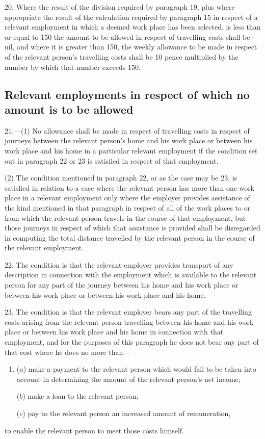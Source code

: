 \documentclass[a4paper]{article}
\begin{document}
\medskip

20.  Where the result of the division required by paragraph 19, plus where appropriate the result of the calculation required by paragraph 15 in respect of a relevant employment in which a deemed work place has been selected, is less than or equal to 150 the amount to be allowed in respect of travelling costs shall be nil, and where it is greater than 150, the weekly allowance to be made in respect of the relevant person’s travelling costs shall be 10 pence multiplied by the number by which that number exceeds 150.

\subsection*{Relevant employments in respect of which no amount is to be allowed}

21.—(1) No allowance shall be made in respect of travelling costs in respect of journeys between the relevant person’s home and his work place or between his work place and his home in a particular relevant employment if the condition set out in paragraph 22 or 23 is satisfied in respect of that employment.

(2) The condition mentioned in paragraph 22, or as the case may be 23, is satisfied in relation to a case where the relevant person has more than one work place in a relevant employment only where the employer provides assistance of the kind mentioned in that paragraph in respect of all of the work places to or from which the relevant person travels in the course of that employment, but those journeys in respect of which that assistance is provided shall be disregarded in computing the total distance travelled by the relevant person in the course of the relevant employment.

\medskip

22.  The condition is that the relevant employer provides transport of any description in connection with the employment which is available to the relevant person for any part of the journey between his home and his work place or between his work place or between his work place and his home.

\medskip

23.  The condition is that the relevant employer bears any part of the travelling costs arising from the relevant person travelling between his home and his work place or between his work place and his home in connection with that employment, and for the purposes of this paragraph he does not bear any part of that cost where he does no more than—
\begin{enumerate}\item[]
($a$) make a payment to the relevant person which would fail to be taken into account in determining the amount of the relevant person’s net income;

($b$) make a loan to the relevant person;

($c$) pay to the relevant person an increased amount of remuneration,
\end{enumerate}
to enable the relevant person to meet those costs himself.
\end{document}
